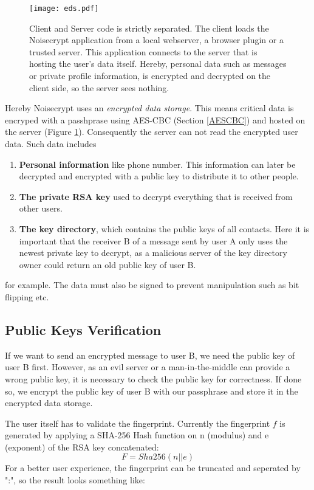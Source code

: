 \documentclass{scrartcl}
\begin{document}
\begin{figure}[ht]
	\centering
  \texttt{[image: eds.pdf]}
	\caption{Client and Server code is strictly separated. The client loads the Noisecrypt application from a local webserver, a browser plugin or a trusted server. This application connects to the server that is hosting the user's data itself. Hereby, personal data such as messages or private profile information, is encrypted and decrypted on the client side, so the server sees nothing.}
	\label{fig1}
\end{figure}


Hereby Noisecrypt uses an \textit{encrypted data storage}. This means critical data is encryped with a passhprase using AES-CBC (Section \ref{AESCBC}) and hosted on the server  (Figure \ref{fig1}). Consequently the server can not read the encrypted user data. Such data includes
\begin{enumerate}
\item \textbf{Personal information} like phone number. This information can later be decrypted and encrypted with a public key to distribute it to other people.
\item \textbf{The private RSA key} used to decrypt everything that is received from other users.
\item \textbf{The key directory}, which contains the public keys of all contacts. Here it is important that the receiver B of a message sent by user A only uses the newest private key to decrypt, as a malicious server of the key directory owner could return an old public key of user B.
\end{enumerate}
for example. The data must also be signed to prevent manipulation such as bit flipping etc.

\subsection{Public Keys Verification}
If we want to send an encrypted message to user B, we need the public key of user B first. However, as an evil server or a man-in-the-middle can provide a wrong public key, it is necessary to check the public key for correctness. If done so, we encrypt the public key of user B with our passphrase and store it in the encrypted data storage.
 

The user itself has to validate the fingerprint. Currently the fingerprint $f$ is generated by applying a SHA-256 Hash function on n (modulus) and e (exponent) of the RSA key concatenated:
   $$
   F = Sha256(n || e)
   $$
 For a better user experience, the fingerprint can be truncated and  seperated by ":", so the result looks something like:
  
\end{document}
